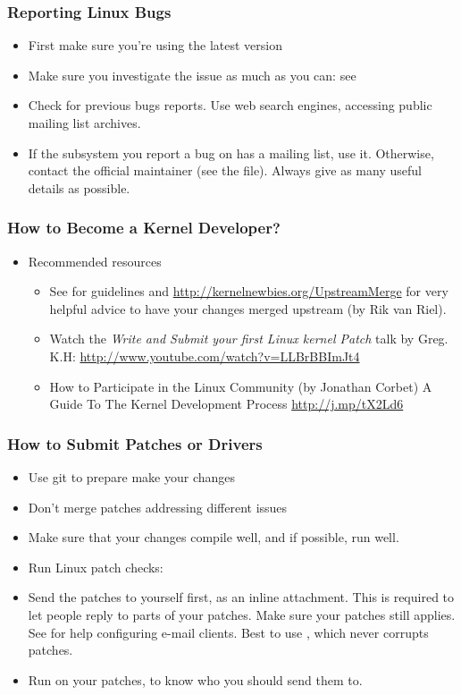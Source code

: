 \begin{frame}
  \frametitle{Reporting Linux Bugs}
  \begin{itemize}
  \item First make sure you're using the latest version
  \item Make sure you investigate the issue as much as you can: see
  \item Check for previous bugs reports. Use web search engines,
    accessing public mailing list archives.
  \item If the subsystem you report a bug on has a mailing list, use
    it. Otherwise, contact the official maintainer (see the
     file). Always give as many useful details as
    possible.
  \end{itemize}
\end{frame}

\begin{frame}
  \frametitle{How to Become a Kernel Developer?}
  \begin{itemize}
  \item Recommended resources
    \begin{itemize}
    \item See  for guidelines
      and \url{http://kernelnewbies.org/UpstreamMerge} for very
      helpful advice to have your changes merged upstream (by Rik van
      Riel).
    \item Watch the \emph{Write and Submit your first Linux kernel
        Patch} talk by Greg. K.H:
      \url{http://www.youtube.com/watch?v=LLBrBBImJt4}
    \item How to Participate in the Linux Community (by Jonathan
      Corbet) A Guide To The Kernel Development Process
      \url{http://j.mp/tX2Ld6}
    \end{itemize}
  \end{itemize}
\end{frame}


\begin{frame}
  \frametitle{How to Submit Patches or Drivers}
  \begin{itemize}
  \item Use git to prepare make your changes
  \item Don't merge patches addressing different issues
  \item Make sure that your changes compile well, and if possible, run well.
  \item Run Linux patch checks: 
  \item Send the patches to yourself first, as an inline
    attachment. This is required to let people reply to parts of your
    patches. Make sure your patches still applies. See
     for help configuring e-mail
    clients. Best to use , which never corrupts
    patches.
  \item Run  on your patches, to know
    who you should send them to.
  \end{itemize}
\end{frame}
